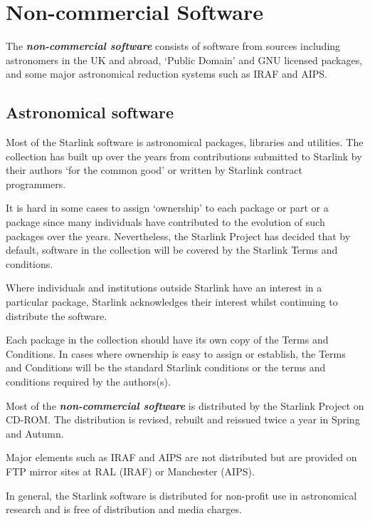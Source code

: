 \documentclass[twoside,11pt]{article}
\newcommand{\xlabel}[1]{}
\renewcommand{\_}{\texttt{\symbol{95}}}
\begin{document}
\section{\xlabel{non-commercial_software}Non-commercial Software}
\label{non-commercial_software}

The \textbf{\textit{non-commercial software}} consists of software
from sources including astronomers in the UK and abroad, `Public
Domain' and GNU licensed packages, and some major astronomical
reduction systems such as IRAF and AIPS.  

\subsection{\xlabel{astronomical_software}Astronomical software}
\label{astronomical_software}

Most of the Starlink software is astronomical packages, libraries and 
utilities.  The collection has built up over the years from contributions
submitted to Starlink by their authors `for the common good' or written 
by Starlink contract programmers.

It is hard in some cases to assign `ownership' to each package or part
or a package since many individuals have contributed to the evolution
of such packages over the years.  Nevertheless, the Starlink Project
has decided that by default, software in the collection will be covered
by the Starlink Terms and conditions.

Where individuals and institutions outside Starlink have an interest 
in a particular package, Starlink acknowledges their interest whilst
continuing to distribute the software.

Each package in the collection should have its own copy of the
Terms and Conditions.  In cases where ownership is easy to assign or
establish, the Terms and Conditions will be the standard Starlink conditions
or the terms and conditions required by the authors(s).

Most of the \textbf{\textit{non-commercial software}} is distributed 
by the Starlink Project on CD-ROM\@.  The distribution is revised, rebuilt and
reissued twice a year in Spring and Autumn.

Major elements such as IRAF and AIPS are not distributed but are provided
on FTP mirror sites at RAL (IRAF) or Manchester (AIPS).

In general, the Starlink software is distributed for non-profit use in
astronomical research and is free of distribution and media charges.
\end{document}

